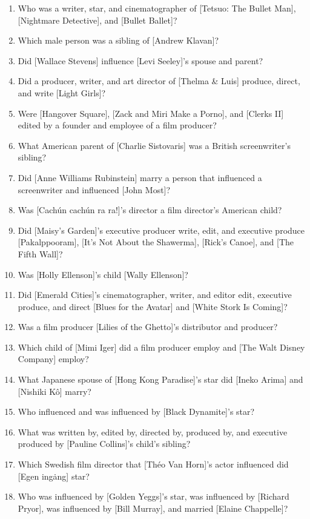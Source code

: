 \documentclass[letterpaper]{article}
\begin{document}
\begin{enumerate}
    \item Who was a writer, star, and cinematographer of [Tetsuo: The Bullet Man], [Nightmare Detective], and [Bullet Ballet]?
    \item Which male person was a sibling of [Andrew Klavan]?
    \item Did [Wallace Stevens] influence [Levi Seeley]'s spouse and parent?\label{debatable1}
    \item Did a producer, writer, and art director of [Thelma \& Luis] produce, direct, and write [Light Girls]?
    \item Were [Hangover Square], [Zack and Miri Make a Porno], and [Clerks II] edited by a founder and employee of a film producer?
    \item What American parent of [Charlie Sistovaris] was a British screenwriter's sibling?
    \item Did [Anne Williams Rubinstein] marry a person that influenced a screenwriter and influenced [John Most]?
    \item Was [Cach\'{u}n cach\'{u}n ra ra!]'s director a film director's American child?
    \item Did [Maisy's Garden]'s executive producer write, edit, and executive produce [Pakalppooram], [It's Not About the Shawerma], [Rick's Canoe], and [The Fifth Wall]?
    \item Was [Holly Ellenson]'s child [Wally Ellenson]?
    \item Did [Emerald Cities]'s cinematographer, writer, and editor edit, executive produce, and direct [Blues for the Avatar] and [White Stork Is Coming]?
    \item Was a film producer [Lilies of the Ghetto]'s distributor and producer?
    \item Which child of [Mimi Iger] did a film producer employ and [The Walt Disney Company] employ?
    \item What Japanese spouse of [Hong Kong Paradise]'s star did [Ineko Arima] and [Nishiki K\^{o}] marry?
    \item Who influenced and was influenced by [Black Dynamite]'s star?
    \item What was written by, edited by, directed by, produced by, and executive produced by [Pauline Collins]'s child's sibling?
    \item Which Swedish film director that [Th\'{e}o Van Horn]'s actor influenced did [Egen ing\.{a}ng] star?
    \item Who was influenced by [Golden Yeggs]'s star, was influenced by [Richard Pryor], was influenced by [Bill Murray], and married [Elaine Chappelle]?

\end{enumerate}
\end{document}
